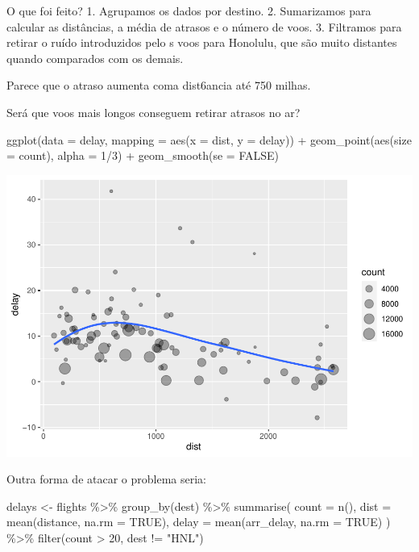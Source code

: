 \documentclass[
]{article}
\newenvironment{Shaded}{\begin{snugshade}}{\end{snugshade}}
\newcommand{\AttributeTok}[1]{\textcolor[rgb]{0.77,0.63,0.00}{#1}}
\newcommand{\ConstantTok}[1]{\textcolor[rgb]{0.00,0.00,0.00}{#1}}
\newcommand{\DecValTok}[1]{\textcolor[rgb]{0.00,0.00,0.81}{#1}}
\newcommand{\FunctionTok}[1]{\textcolor[rgb]{0.00,0.00,0.00}{#1}}
\newcommand{\NormalTok}[1]{#1}
\newcommand{\OtherTok}[1]{\textcolor[rgb]{0.56,0.35,0.01}{#1}}
\newcommand{\SpecialCharTok}[1]{\textcolor[rgb]{0.00,0.00,0.00}{#1}}
\newcommand{\StringTok}[1]{\textcolor[rgb]{0.31,0.60,0.02}{#1}}
\begin{document}
O que foi feito? 1. Agrupamos os dados por destino. 2. Sumarizamos para
calcular as distâncias, a média de atrasos e o número de voos. 3.
Filtramos para retirar o ruído introduzidos pelo s voos para Honolulu,
que são muito distantes quando comparados com os demais.

Parece que o atraso aumenta coma dist6ancia até 750 milhas.

Será que voos mais longos conseguem retirar atrasos no ar?

\begin{Shaded}
\begin{Highlighting}[]
\FunctionTok{ggplot}\NormalTok{(}\AttributeTok{data =}\NormalTok{ delay, }\AttributeTok{mapping =} \FunctionTok{aes}\NormalTok{(}\AttributeTok{x =}\NormalTok{ dist, }\AttributeTok{y =}\NormalTok{ delay)) }\SpecialCharTok{+}
  \FunctionTok{geom\_point}\NormalTok{(}\FunctionTok{aes}\NormalTok{(}\AttributeTok{size =}\NormalTok{ count), }\AttributeTok{alpha =} \DecValTok{1}\SpecialCharTok{/}\DecValTok{3}\NormalTok{) }\SpecialCharTok{+}
  \FunctionTok{geom\_smooth}\NormalTok{(}\AttributeTok{se =} \ConstantTok{FALSE}\NormalTok{)}
\end{Highlighting}
\end{Shaded}

\includegraphics{mind2_files/figure-latex/unnamed-chunk-35-1.pdf}

Outra forma de atacar o problema seria:

\begin{Shaded}
\begin{Highlighting}[]
\NormalTok{delays }\OtherTok{\textless{}{-}}\NormalTok{ flights }\SpecialCharTok{\%\textgreater{}\%} 
  \FunctionTok{group\_by}\NormalTok{(dest) }\SpecialCharTok{\%\textgreater{}\%} 
  \FunctionTok{summarise}\NormalTok{(}
    \AttributeTok{count =} \FunctionTok{n}\NormalTok{(),}
    \AttributeTok{dist =} \FunctionTok{mean}\NormalTok{(distance, }\AttributeTok{na.rm =} \ConstantTok{TRUE}\NormalTok{),}
    \AttributeTok{delay =} \FunctionTok{mean}\NormalTok{(arr\_delay, }\AttributeTok{na.rm =} \ConstantTok{TRUE}\NormalTok{)}
\NormalTok{  ) }\SpecialCharTok{\%\textgreater{}\%} 
  \FunctionTok{filter}\NormalTok{(count }\SpecialCharTok{\textgreater{}} \DecValTok{20}\NormalTok{, dest }\SpecialCharTok{!=} \StringTok{"HNL"}\NormalTok{)}
\end{Highlighting}
\end{Shaded}
\end{document}
